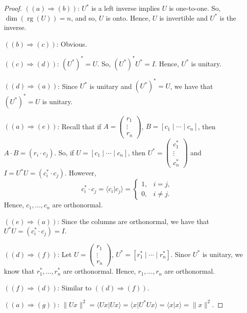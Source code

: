 \documentclass[12pt]{article}
\theoremstyle{definition}
\newcommand{\braket}[2]{\langle #1|#2\rangle}
\newcommand{\norm}[1]{\|#1\|}
\DeclareMathOperator{\rg}{rg}
\begin{document}
\begin{proof}
$((a) \Rightarrow (b))$: $U^*$ is a left inverse implies $U$ is one-to-one. So, $\dim(\rg(U)) = n$, and so, $U$ is onto. Hence, $U$ is invertible and $U^*$ is the inverse.

$((b) \Rightarrow (c))$: Obvious.

$((c) \Rightarrow (d))$: $(U^*)^* = U$. So, $(U^*)^* U^* = I$. Hence, $U^*$ is unitary.

$((d) \Rightarrow (a))$: Since $U^*$ is unitary and $(U^*)^* = U$, we have that $(U^*)^* = U$ is unitary.

$((a) \Rightarrow (e))$: Recall that if $A = \begin{pmatrix} r_1 \\ \vdots \\ r_n \end{pmatrix}$, $B = [c_1 \mid \cdots \mid c_n]$, then $A \cdot B = (r_i \cdot c_j)$. So, if $U = [c_1 \mid \cdots \mid c_n]$, then $U^* = \begin{pmatrix} c_1^* \\ \vdots \\ c_n^* \end{pmatrix}$ and $I = U^*U = (c_i^* \cdot c_j)$. However,
\[
c_i^* \cdot c_j = \braket{c_i}{c_j} = \begin{cases} 1, & i=j,\\ 0, & i\neq j.\end{cases}
\]
Hence, $c_1,\ldots,c_n$ are orthonormal.

$((e) \Rightarrow (a))$: Since the columns are orthonormal, we have that $U^*U = (c_i^* \cdot c_j) = I$.

$((d) \Rightarrow (f))$: Let $U = \begin{pmatrix} r_1 \\ \vdots \\ r_n \end{pmatrix}$, $U^* = [r_1^* \mid \cdots \mid r_n^*]$. Since $U^*$ is unitary, we know that $r_1^*,\ldots,r_n^*$ are orthonormal. Hence, $r_1,\ldots,r_n$ are orthonormal.

$((f) \Rightarrow (d))$: Similar to $((d) \Rightarrow (f))$.

$((a) \Rightarrow (g))$: $\norm{Ux}^2 = \braket{Ux}{Ux} = \braket{x}{U^*Ux} = \braket{x}{x} = \norm{x}^2$.


\end{proof}
\end{document}
